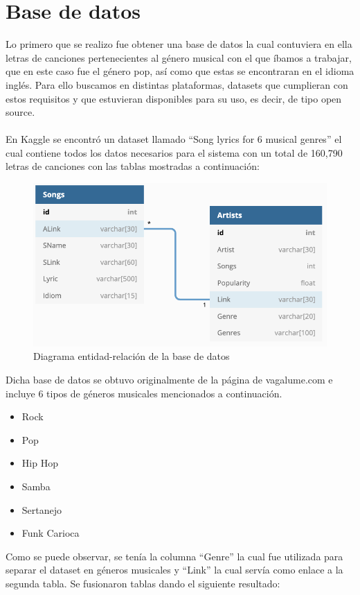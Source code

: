 \documentclass[12pt, a4paper, titlepage]{article}
\begin{document}
	\section{Base de datos}
	Lo primero que se realizo fue obtener una base de datos la cual contuviera en ella letras de canciones pertenecientes al género musical con el que íbamos a trabajar, que en este caso fue el género pop, así como que estas se encontraran en el idioma inglés. Para ello buscamos en distintas plataformas, datasets que cumplieran con estos requisitos y que estuvieran disponibles para su uso, es decir, de tipo open source.\\\\
	En Kaggle \cite{kaggle} se encontró un dataset llamado “Song lyrics for 6 musical genres” \cite{kaggleDataset} el cual contiene todos los datos necesarios para el sistema con un total de 160,790 letras de canciones con las tablas mostradas a continuación: 
	\begin{figure}[H]
		\includegraphics[width=12cm]{./Imagenes/BasedeDatos/diagrama_ER_BD.jpg}
		\centering 
		\caption{Diagrama entidad-relación de la base de datos}
	\end{figure}
	Dicha base de datos se obtuvo originalmente de la página de vagalume.com \cite{vagalume} e incluye 6 tipos de géneros musicales mencionados a continuación.
	\begin{itemize}
		\item Rock
		\item Pop
		\item Hip Hop
		\item Samba
		\item Sertanejo
		\item Funk Carioca
	\end{itemize}
	Como se puede observar, se tenía la columna “Genre” la cual fue utilizada para separar el dataset en géneros musicales y “Link” la cual servía como enlace a la segunda tabla. Se fusionaron tablas dando el siguiente resultado:
\end{document}

